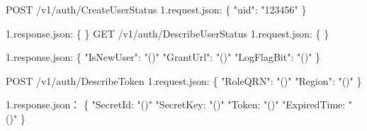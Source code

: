 POST /v1/auth/CreateUserStatus
1.request.json:
\{
"uid": "123456"
\}

1.response.json:
\{
\}
GET /v1/auth/DescribeUserStatus
1.request.json:
\{
\}

1.response.json:
\{
"IsNewUser": "\@exists()"
"GrantUrl": "\@exists()"
"LogFlagBit": "\@exists()"
\}

POST /v1/auth/DescribeToken
1.request.json:
\{
"RoleQRN": "\@notEmpty()"
"Region": "\@notEmpty()"
\}

1.response.json：
\{
"SecretId: "\@notEmpty()"
"SecretKey: "\@notEmpty()"
"Token: "\@exists()"
"ExpiredTime: "\@exists()"
\}

%
%
%
%
%
%
%


